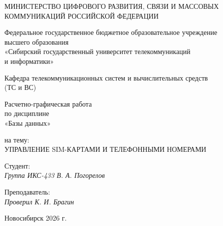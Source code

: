 \thispagestyle{empty}

\begin{center}
    МИНИСТЕРСТВО ЦИФРОВОГО РАЗВИТИЯ, СВЯЗИ И МАССОВЫХ \\
    КОММУНИКАЦИЙ РОССИЙСКОЙ ФЕДЕРАЦИИ

    \vspace{20pt}

    Федеральное государственное бюджетное образовательное учреждение \\
    высшего образования \\
    «Сибирский государственный университет телекоммуникаций \\
    и информатики»

    \vspace{20pt}

    Кафедра телекоммуникационных систем и вычислительных средств \\
    (ТС и ВС)
\end{center}

\vfill

\begin{center}
    Расчетно-графическая работа \\
    по дисциплине \\
    «Базы данных»

    \vspace{20pt}

    на тему: \\
    \MakeUppercase{Управление SIM-картами и телефонными номерами}
\end{center}

\vfill

\noindent Студент: \\
\textit{Группа ИКС-433 \hfill В. А. Погорелов}

\vspace{20pt}

\noindent Преподаватель: \\
\textit{Проверил \hfill К. И. Брагин}

\vfill

\begin{center}
    Новосибирск 2026 г.
\end{center}

